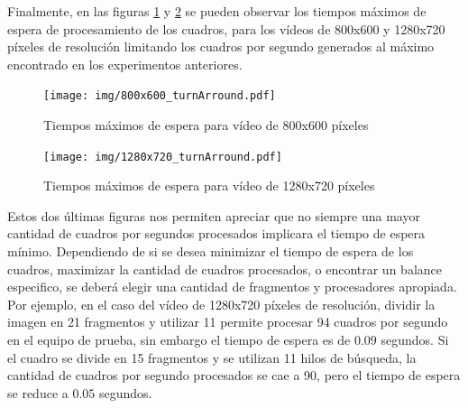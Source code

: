Finalmente, en las figuras \ref{800turnArround} y \ref{1280turnArround} se
pueden observar los tiempos máximos de espera de procesamiento de los cuadros,
para los vídeos de 800x600 y 1280x720 píxeles de resolución limitando los
cuadros por segundo generados al máximo encontrado en los experimentos
anteriores.

\begin{figure}[!h]

	\texttt{[image: img/800x600\_turnArround.pdf]}
	\caption{Tiempos máximos de espera para vídeo de 800x600 píxeles}
	\label{800turnArround}

\end{figure}


\begin{figure}[!h]

	\texttt{[image: img/1280x720\_turnArround.pdf]}
	\caption{Tiempos máximos de espera para vídeo de 1280x720 píxeles}
	\label{1280turnArround}

\end{figure}

Estos dos últimas figuras nos permiten apreciar que no siempre una mayor
cantidad de cuadros por segundos procesados implicara el tiempo de espera
mínimo. Dependiendo de si se desea minimizar el tiempo de espera de los cuadros,
maximizar la cantidad de cuadros procesados, o encontrar un balance especifico,
se deberá elegir una cantidad de fragmentos y procesadores apropiada. Por
ejemplo, en el caso del vídeo de 1280x720 píxeles de resolución, dividir la
imagen en 21 fragmentos y utilizar 11 permite procesar 94 cuadros por segundo en
el equipo de prueba, sin embargo el tiempo de espera es de $0.09$ segundos. Si
el cuadro se divide en 15 fragmentos y se utilizan 11 hilos de búsqueda, la
cantidad de cuadros por segundo procesados se cae a 90, pero el tiempo de espera
se reduce a $0.05$ segundos.
